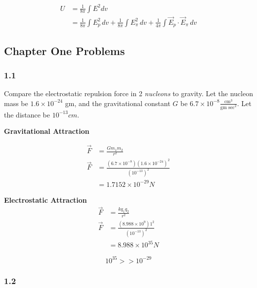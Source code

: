 \documentclass[svgnames]{article}
\begin{document}
\begin{align*} 
U &= \frac{1}{8\pi} \int E^2 dv \\
&= \frac{1}{8\pi} \int E_p^2 \, dv + \frac{1}{8\pi} \int E_\pi^2 \, dv
+ \frac{1}{4\pi} \int \vec{E}_p \cdot \vec{E}_\pi \, dv
\end{align*}
 
 \vspace{20px}
 \subsection{Chapter One Problems} 
 
 \subsubsection{1.1} 
 
Compare the electrostatic repulsion force in 2 \textit{nucleons} to gravity.
Let the nucleon mass be $1.6 \times 10^{-24}$ gm, and the gravitational
constant $G$ be $ 6.7 \times 10^{-8} \frac{\text{cm}^3}{\text{gm sec}^2}$. Let
the distance be $10^{-13} cm$. 
 
 \vspace{20px} 
 
 \textbf{Gravitational Attraction} 
 
 \begin{align*} 
 \vec{F} &= \frac{Gm_1m_2}{r^2} \\
 \vec{F} &= \frac{(6.7 \times 10^{-8}) (1.6 \times 10^{-24})^2}{(10^{-13})^2} \\
 & = 1.7152 \times 10^{-29} N 
 \end{align*}
 
 \vspace{10px} 
 
 \textbf{Electrostatic Attraction} 
 \begin{align*} 
 \vec{F} &= \frac{kq_1q_2}{r^2} \\
 \vec{F} &= \frac{(8.988 \times 10^{9})1^2}{(10^{-13})^2} \\
 & = 8.988 \times 10^{35} N
 \end{align*}
 
\vspace{10px} 

\[ 10^{35} >> 10^{-29} \]

\subsubsection{1.2}
\end{document}
